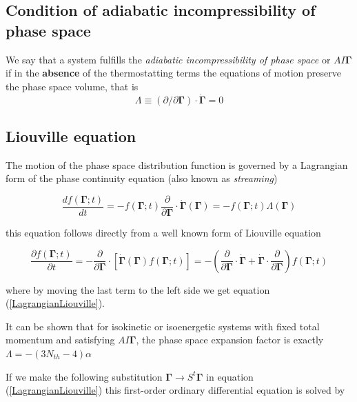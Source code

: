 \documentclass[a4paper,12pt,nofootinbib]{article}
\begin{document}
\subsection{Condition of adiabatic incompressibility of phase space}

We say that a system fulfills the \textit{adiabatic incompressibility of phase space} or $AI\bm{\Gamma}$ if in the \textbf{absence} of the thermostatting terms the equations of motion preserve the phase space volume, that is
\begin{equation}
  \Lambda \equiv (\partial / \partial\bm{\Gamma}) \cdot \dot{\bm{\Gamma}}=0
\end{equation}


\subsection{Liouville equation}

The motion of the phase space distribution function is governed by a Lagrangian form of the phase continuity equation (also known as \textit{streaming})

\begin{equation}
\label{LagrangianLiouville}
  \frac{df(\bm{\Gamma};t)}{dt}=-f(\bm{\Gamma};t)\frac{\partial}{\partial \bm{\Gamma}} \cdot \dot{\bm{\Gamma}}(\bm{\Gamma}) = -f(\bm{\Gamma};t)\Lambda(\bm{\Gamma})
\end{equation}

this equation follows directly from a well known form of Liouville equation

\begin{equation}
    \frac{\partial f(\bm{\Gamma};t) }{\partial t}
    = -\frac{\partial}{\partial \bm{\Gamma}} \cdot [\dot{\bm{\Gamma}}(\bm{\Gamma}) f(\bm{\Gamma};t)]
     = -(\frac{\partial}{\partial \bm{\Gamma}} \cdot \dot{\bm{\Gamma}} + \dot{\bm{\Gamma}} \cdot \frac{\partial}{\partial \bm{\Gamma}}) f(\bm{\Gamma};t)
\end{equation}

where by moving the last term to the left side we get equation (\ref{LagrangianLiouville}).


It can be shown that for isokinetic or isoenergetic systems with fixed total momentum and satisfying $AI\bm{\Gamma}$, the phase space expansion factor is exactly $\Lambda = - (3N_{th} -4) \alpha $ 

If we make the following substitution $\bm{\Gamma} \to S^t\bm{\Gamma}$ in equation (\ref{LagrangianLiouville}) this first-order ordinary differential equation is solved by
\end{document}
